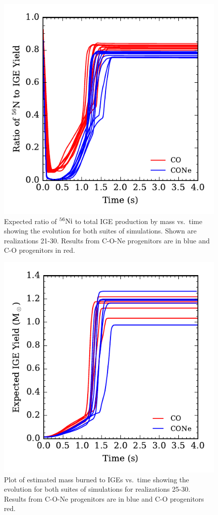 \documentclass[preprint2]{aastex63}
\newcommand{\Ni}[1]{\ensuremath{{}^{#1}{\rm Ni}}}
\begin{document}
\begin{figure}
\includegraphics[width=\columnwidth]{figures/RatioNi56IGE_v_time_plot.pdf}
\caption{\label{fig:compare_ratio}
Expected ratio of \Ni{56} to total IGE production by mass vs.\ time showing the evolution
for both suites of simulations. 
{\color{red} Shown are realizations 21-30.}
Results from C-O-Ne progenitors are in blue and C-O progenitors in red.
}
\end{figure}
\begin{figure}
\includegraphics[width=\columnwidth]{figures/MBTI_v_time_plot.pdf}
\caption{\label{fig:compare_burned}
Plot of estimated mass burned to IGEs vs.\ time showing the evolution
for both suites of simulations for realizations 25-30. Results from C-O-Ne progenitors are
in blue and C-O progenitors red.
}
\end{figure}
\end{document}

